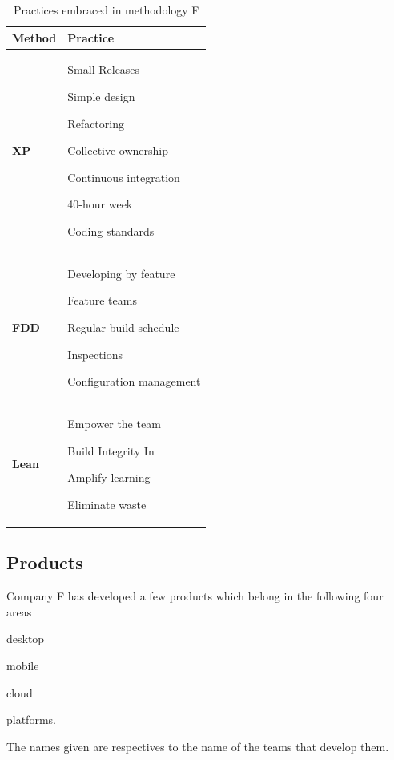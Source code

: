 \begin{table} [H]
\caption{Practices embraced in methodology F}
\begin{tabular}{| p{2cm} | p{13cm}|}
    \hline
     \textbf{Method} & \textbf{Practice} \\ \hline
     \textbf{XP}  & \begin{inparaenum} [a\upshape)]
     				\item Small Releases \item Simple design \item Refactoring \item Collective ownership \item Continuous integration \item 40-hour week \item Coding standards
					\end{inparaenum}      \\ \hline
     \textbf{FDD}  & \begin{inparaenum} [a\upshape)]  \item Developing by feature \item Feature teams \item Regular build schedule \item Inspections \item Configuration management
     				  \end{inparaenum}\\ \hline
     \textbf{Lean} & \begin{inparaenum} [a\upshape)] \item Empower the team \item Build Integrity In \item Amplify learning \item Eliminate waste
     				 \end{inparaenum} \\ \hline
\end{tabular}
\label{table:methodologyF_practices}
\end{table}

\subsection{Products}
Company F has developed a few products which belong in the following four areas 
\begin{inparaenum} [a\upshape)]
\item desktop
\item mobile
\item cloud
\item platforms.
\end{inparaenum}
The names given are respectives to the name of the teams that develop them.

